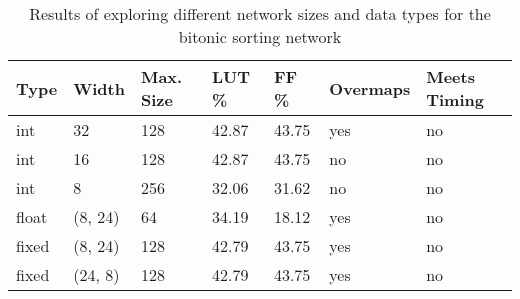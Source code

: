 \begin{table}[!ht]
  \begin{tabularx}{\textwidth}{X | X | X | X | X | p{2cm} |  X}
    \textbf{Type} & \textbf{Width} & \textbf{Max. Size} & \textbf{LUT \%} & \textbf{FF \%} & \textbf{Overmaps} & \textbf{Meets Timing} \\
    \hline
    \hline
    int           & 32             & 128                & 42.87           & 43.75          & yes               & no                    \\
    int           & 16             & 128                & 42.87           & 43.75          & no                & no                    \\
    int           & 8              & 256                & 32.06           & 31.62          & no                & no                    \\
    float         & (8, 24)        & 64                 & 34.19           & 18.12          & yes               & no                    \\
    fixed         & (8, 24)        & 128                & 42.79           & 43.75          & yes               & no                    \\
    fixed         & (24, 8)        & 128                & 42.79           & 43.75          & yes               & no                    \\
  \end{tabularx}
  \caption{Results of exploring different network sizes and data types for the bitonic sorting network}
  \label{table:bsort-bitwidth}
\end{table}
